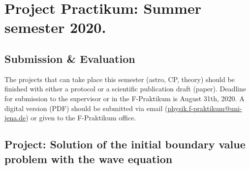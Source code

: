 \documentclass[11pt,a4paper,headinclude=true,DIV=14,BCOR=8mm,chapterprefix,listof=totoc,twoside,openright,abstracton]{scrbook}
\begin{document}

\chapter*{Project Practikum: Summer semester 2020. }

\section*{Submission \& Evaluation}
The projects that can take place this semester (astro, CP, theory) should be finished with either a protocol or a scientific publication draft (paper). Deadline for submission to the supervisor or in the F-Praktikum is August 31th, 2020. A digital version (PDF) should be submitted via email (\url{physik.f-praktikum@uni-jena.de}) or given to the F-Praktikum office. 


\section*{Project: Solution of the initial boundary value problem with the wave equation}
\end{document}
